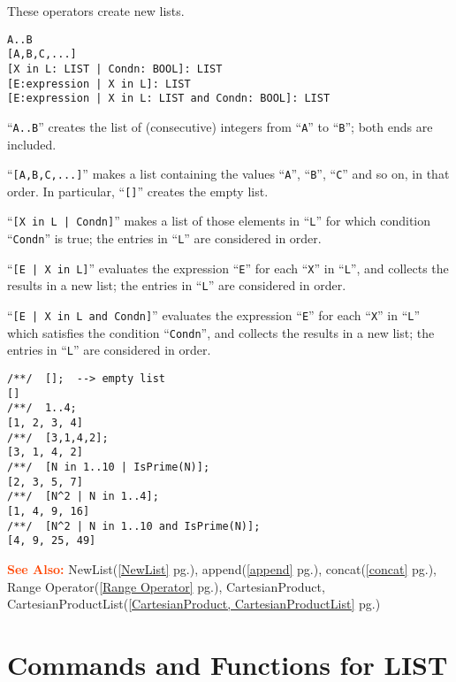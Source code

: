 \documentclass[a4paper]{mybook}
\newcommand\SeeAlso{\par\textcolor{OrangeRed}{\textbf{\large See Also: }}}
\begin{document}
        
These operators create new lists.
\begin{verbatim}
A..B
[A,B,C,...]
[X in L: LIST | Condn: BOOL]: LIST
[E:expression | X in L]: LIST
[E:expression | X in L: LIST and Condn: BOOL]: LIST
\end{verbatim}
``\verb&A..B&'' creates the list of (consecutive) integers from ``\verb&A&'' to ``\verb&B&'';
    both ends are included.
\par 
``\verb&[A,B,C,...]&'' makes a list containing the values ``\verb&A&'', ``\verb&B&'', ``\verb&C&'' and so on,
    in that order.  In particular, ``\verb&[]&'' creates the empty list.
\par 
``\verb&[X in L | Condn]&'' makes a list of those elements in ``\verb&L&'' for which
    condition ``\verb&Condn&'' is true; the entries in ``\verb&L&'' are considered in order.
\par 
``\verb&[E | X in L]&'' evaluates the expression ``\verb&E&'' for each ``\verb&X&'' in ``\verb&L&'', and collects
    the results in a new list; the entries in ``\verb&L&'' are considered in order.
\par 
``\verb&[E | X in L and Condn]&'' evaluates the expression ``\verb&E&'' for each ``\verb&X&'' in ``\verb&L&'' which
    satisfies the condition ``\verb&Condn&'', and collects the results in a new list;
    the entries in ``\verb&L&'' are considered in order.
\begin{Verbatim}[label=example, rulecolor=\color{PineGreen}, frame=single]
/**/  [];  --> empty list
[]
/**/  1..4;
[1, 2, 3, 4]
/**/  [3,1,4,2];
[3, 1, 4, 2]
/**/  [N in 1..10 | IsPrime(N)];
[2, 3, 5, 7]
/**/  [N^2 | N in 1..4];
[1, 4, 9, 16]
/**/  [N^2 | N in 1..10 and IsPrime(N)];
[4, 9, 25, 49]
\end{Verbatim}


\SeeAlso %
  NewList(\ref{NewList} pg.\pageref{NewList}), 
    append(\ref{append} pg.\pageref{append}), 
    concat(\ref{concat} pg.\pageref{concat}), 
    Range Operator(\ref{Range Operator} pg.\pageref{Range Operator}), 
    CartesianProduct, CartesianProductList(\ref{CartesianProduct, CartesianProductList} pg.\pageref{CartesianProduct, CartesianProductList})

\section{Commands and Functions for LIST}
\label{Commands and Functions for LIST}
\end{document}
